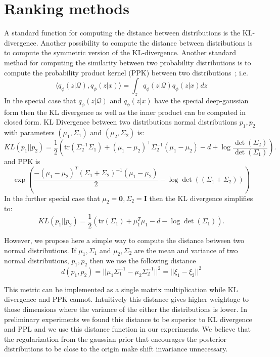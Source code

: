 \documentclass[a4paper]{article}
\newcommand{\cQ}{\mathcal{Q}}
\newcommand{\ip}[2]{\langle  #1, #2 \rangle}
\newcommand{\mycite}[1]{\cite{#1}}%
\begin{document}
\section{Ranking methods}
\label{app:rankings}
A standard function for computing the distance between distributions is the KL-divergence.
Another possibility to compute the distance between distributions is to compute the symmetric version of the KL-divergence.
Another standard method for computing the similarity between two probability distributions is to compute the probability product kernel (PPK) between two distributions~\mycite{jebara2004probability}; i.e.
\[\ip{ q_\phi(z|\cQ)}{q_\phi(z|x)} = \int_z q_\phi(z|\cQ)q_\phi(z|x) dz\]
In the special case that $q_\phi(z|\cQ)$ and $q_\phi(z|x)$ have the special deep-gaussian form then the KL divergence as well as the inner product can be computed in closed form.
  KL Divergence between two distributions normal distributions $p_1, p_2$ with parameters $(\mu_1, \Sigma_1)$ and $(\mu_2, \Sigma_2)$ is:
\[
 KL(p_1 || p_2) = \frac{1}{2}\left(\text{tr}(\Sigma_2^{-1}\Sigma_1) + (\mu_1 - \mu_2)^\top \Sigma_2^{-1}(\mu_1 - \mu_2) - d + \log \frac{\det(\Sigma_2)}{\det(\Sigma_1)}\right).
\] and PPK is
\[
 \exp(\frac{-(\mu_1 - \mu_2)^T (\Sigma_1 + \Sigma_2)^{-1} (\mu_1 - \mu_2)}{2} - \log\det((\Sigma_1 + \Sigma_2)))
\]
In the further special case that $\mu_2 = \mathbf{0}, \Sigma_2 = \mathbf{I}$ then the KL divergence simplifies to:
\[
 KL(p_1 || p_2) = \frac{1}{2}\left(\text{tr}(\Sigma_1) + \mu_1^T \mu_1  - d - \log {\det(\Sigma_1)}\right).
\]

However, we propose here a simple way to compute the distance between two normal distributions. If $\mu_1, \Sigma_1$ and $\mu_2, \Sigma_2$ are the mean and variance of two normal
distributions, $p_1, p_2$ then we use the following distance
\[d(p_1, p_2)  = ||{\mu_1 \Sigma_1^{-1} - \mu_2 \Sigma_2^{-1}}||^2 = ||\xi_1 - \xi_2||^2
\]

This metric can be implemented as a single matrix multiplication while KL divergence and PPK cannot.
Intuitively this distance gives higher weightage to those dimensions where the variance of the either the distributions is lower. In preliminary experiments we  found this distance to be superior to KL divergence and PPL and we use this distance function in our experiments. We believe that the regularization from the gaussian prior that encourages the posterior distributions to be close to the origin make shift invariance unnecessary.
\end{document}
